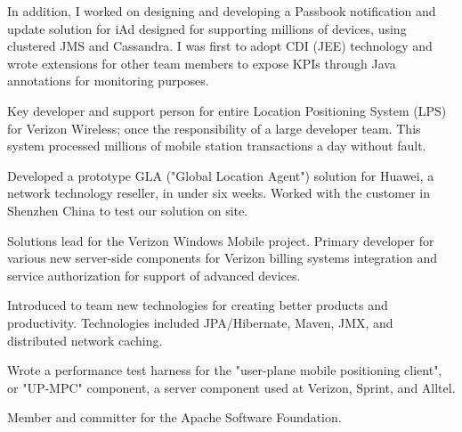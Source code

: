 \documentclass{article}
\begin{document}
In addition, I worked on designing and developing a Passbook notification
and update solution for iAd designed for supporting millions of devices,
using clustered JMS and Cassandra. I was first to adopt CDI (JEE)
technology and wrote extensions for other team members to expose KPIs
through Java annotations for monitoring purposes.


  

Key developer and support person for entire Location Positioning System
(LPS) for Verizon Wireless; once the responsibility of a large developer
team. This system processed millions of mobile station transactions a
day without fault.

Developed a prototype GLA ("Global Location Agent") solution for Huawei,
a network technology reseller, in under six weeks. Worked with the
customer in Shenzhen China to test our solution on site.


  

Solutions lead for the Verizon Windows Mobile project. Primary developer
for various new server-side components for Verizon billing systems
integration and service authorization for support of advanced devices.

Introduced to team new technologies for creating better products and
productivity. Technologies included JPA/Hibernate, Maven, JMX, and
distributed network caching.

Wrote a performance test harness for the "user-plane mobile positioning
client", or "UP-MPC" component, a server component used at Verizon,
Sprint, and Alltel.

Member and committer for the Apache Software Foundation.
\end{document}
